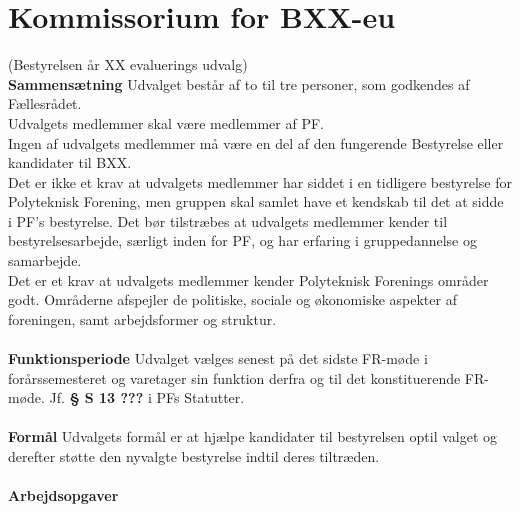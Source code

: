 \section{Kommissorium for BXX-eu}
(Bestyrelsen år XX evaluerings udvalg)\\

\textbf{Sammensætning}
Udvalget består af to til tre personer, som godkendes af Fællesrådet.\\
Udvalgets medlemmer skal være medlemmer af PF.\\
Ingen af udvalgets medlemmer må være en del af den fungerende Bestyrelse eller kandidater til BXX.\\
Det er ikke et krav at udvalgets medlemmer har siddet i en tidligere bestyrelse for Polyteknisk Forening, men gruppen skal samlet have et kendskab til det at sidde i PF’s bestyrelse. Det bør tilstræbes at udvalgets medlemmer kender til bestyrelsesarbejde, særligt inden for PF, og har erfaring i gruppedannelse og samarbejde.\\
Det er et krav at udvalgets medlemmer kender Polyteknisk Forenings områder godt. Områderne afspejler de politiske, sociale og økonomiske aspekter af foreningen, samt arbejdsformer og struktur.\\
\\
\textbf{Funktionsperiode}
Udvalget vælges senest på det sidste FR-møde i forårssemesteret og varetager sin funktion derfra og til det konstituerende FR-møde. Jf. \textbf{§ S 13 ???} i PFs Statutter.\\
\\
\textbf{Formål}
Udvalgets formål er at hjælpe kandidater til bestyrelsen optil valget og derefter støtte den nyvalgte bestyrelse indtil
deres tiltræden.
\\
\\
\textbf{Arbejdsopgaver}
